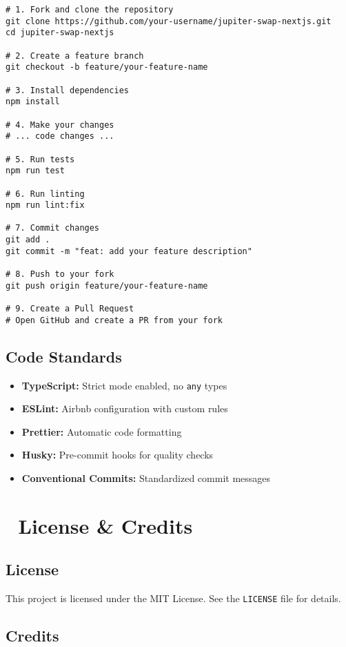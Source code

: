 \documentclass[11pt,a4paper]{article}
\begin{document}
\begin{lstlisting}[style=bash, caption=Development Workflow]
# 1. Fork and clone the repository
git clone https://github.com/your-username/jupiter-swap-nextjs.git
cd jupiter-swap-nextjs

# 2. Create a feature branch
git checkout -b feature/your-feature-name

# 3. Install dependencies
npm install

# 4. Make your changes
# ... code changes ...

# 5. Run tests
npm run test

# 6. Run linting
npm run lint:fix

# 7. Commit changes
git add .
git commit -m "feat: add your feature description"

# 8. Push to your fork
git push origin feature/your-feature-name

# 9. Create a Pull Request
# Open GitHub and create a PR from your fork
\end{lstlisting}

\subsection{Code Standards}

\begin{itemize}
    \item \textbf{TypeScript:} Strict mode enabled, no \texttt{any} types
    \item \textbf{ESLint:} Airbnb configuration with custom rules
    \item \textbf{Prettier:} Automatic code formatting
    \item \textbf{Husky:} Pre-commit hooks for quality checks
    \item \textbf{Conventional Commits:} Standardized commit messages
\end{itemize}

\section{📄 License \& Credits}

\subsection{License}

This project is licensed under the MIT License. See the \texttt{LICENSE} file for details.

\subsection{Credits}
\end{document}
